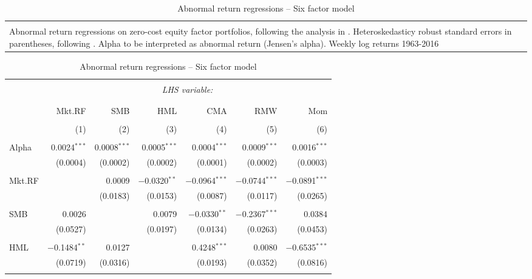 \begin{table}[!htbp] \centering 
  \caption{Abnormal return regressions -- Six factor model} 
  \label{fig:abnormal_six} 
\begin{tabularx}{\textwidth}{X}
\\[-1.8ex]\toprule
\\[-1.8ex] 
\footnotesize Abnormal return regressions on zero-cost equity factor portfolios, following the analysis in \textcite{FF2015}. Heteroskedasticy robust standard errors in parentheses, following \textcite{White1982}. Alpha to be interpreted as abnormal return (Jensen's alpha). Weekly log returns 1963-2016
\end{tabularx}
\begin{tabularx}{\textwidth}{@{\extracolsep{0pt}}X rrrrrr} 
\\[-1.8ex]\midrule 
\\[-1.8ex] 
 & \multicolumn{6}{c}{\textit{LHS variable:}} \\ 
\cline{2-7} 
\\[-1.8ex] & \multicolumn{6}{c}{ } \\ 
 & Mkt.RF & SMB & HML & CMA & RMW & Mom \\ 
\\[-1.8ex] & (1) & (2) & (3) & (4) & (5) & (6)\\ 
\hline \\[-1.8ex] 
 Alpha & 0.0024$^{***}$ & 0.0008$^{***}$ & 0.0005$^{***}$ & 0.0004$^{***}$ & 0.0009$^{***}$ & 0.0016$^{***}$ \\ 
  & (0.0004) & (0.0002) & (0.0002) & (0.0001) & (0.0002) & (0.0003) \\ 
  & & & & & & \\ 
 Mkt.RF &  & 0.0009 & $-$0.0320$^{**}$ & $-$0.0964$^{***}$ & $-$0.0744$^{***}$ & $-$0.0891$^{***}$ \\ 
  &  & (0.0183) & (0.0153) & (0.0087) & (0.0117) & (0.0265) \\ 
  & & & & & & \\ 
 SMB & 0.0026 &  & 0.0079 & $-$0.0330$^{**}$ & $-$0.2367$^{***}$ & 0.0384 \\ 
  & (0.0527) &  & (0.0197) & (0.0134) & (0.0263) & (0.0453) \\ 
  & & & & & & \\ 
 HML & $-$0.1484$^{**}$ & 0.0127 &  & 0.4248$^{***}$ & 0.0080 & $-$0.6535$^{***}$ \\ 
  & (0.0719) & (0.0316) &  & (0.0193) & (0.0352) & (0.0816) \\ 
  & & & & & & \\ 

\end{tabularx}
\end{table}
